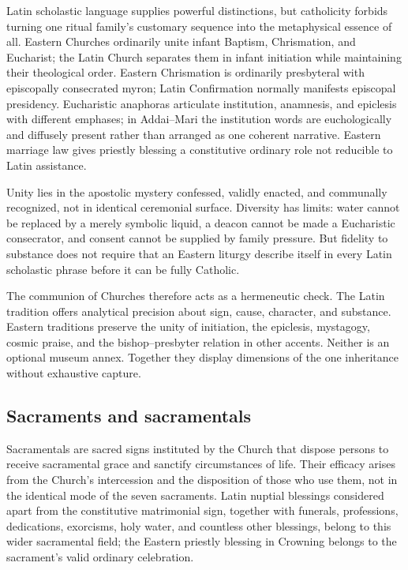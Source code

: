 Latin scholastic language supplies powerful distinctions, but catholicity forbids turning one ritual family's customary sequence into the metaphysical essence of all. Eastern Churches ordinarily unite infant Baptism, Chrismation, and Eucharist; the Latin Church separates them in infant initiation while maintaining their theological order. Eastern Chrismation is ordinarily presbyteral with episcopally consecrated myron; Latin Confirmation normally manifests episcopal presidency. Eucharistic anaphoras articulate institution, anamnesis, and epiclesis with different emphases; in Addai--Mari the institution words are euchologically and diffusely present rather than arranged as one coherent narrative. Eastern marriage law gives priestly blessing a constitutive ordinary role not reducible to Latin assistance.

Unity lies in the apostolic mystery confessed, validly enacted, and communally recognized, not in identical ceremonial surface. Diversity has limits: water cannot be replaced by a merely symbolic liquid, a deacon cannot be made a Eucharistic consecrator, and consent cannot be supplied by family pressure. But fidelity to substance does not require that an Eastern liturgy describe itself in every Latin scholastic phrase before it can be fully Catholic.

The communion of Churches therefore acts as a hermeneutic check. The Latin tradition offers analytical precision about sign, cause, character, and substance. Eastern traditions preserve the unity of initiation, the epiclesis, mystagogy, cosmic praise, and the bishop--presbyter relation in other accents. Neither is an optional museum annex. Together they display dimensions of the one inheritance without exhaustive capture.

\subsection{Sacraments and sacramentals}

Sacramentals are sacred signs instituted by the Church that dispose persons to receive sacramental grace and sanctify circumstances of life. Their efficacy arises from the Church's intercession and the disposition of those who use them, not in the identical  mode of the seven sacraments. Latin nuptial blessings considered apart from the constitutive matrimonial sign, together with funerals, professions, dedications, exorcisms, holy water, and countless other blessings, belong to this wider sacramental field; the Eastern priestly blessing in Crowning belongs to the sacrament's valid ordinary celebration.

